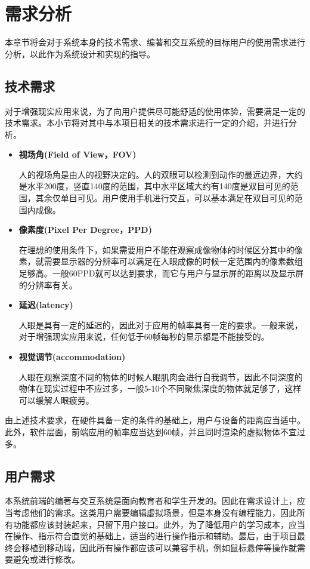 \chapter{需求分析}
\label{requirement}

本章节将会对于系统本身的技术需求、编著和交互系统的目标用户的使用需求进行分析，以此作为系统设计和实现的指导。

\section{技术需求}
对于增强现实应用来说，为了向用户提供尽可能舒适的使用体验，需要满足一定的技术需求。本小节将对其中与本项目相关的技术需求\cite{artech}进行一定的介绍，并进行分析。

\begin{itemize}
    \item \textbf{视场角(Field of View，FOV)}
    
       人的视场角是由人的视野决定的。人的双眼可以检测到动作的最远边界，大约是水平200度，竖直140度的范围，其中水平区域大约有140度是双目可见的范围，其余仅单目可见。用户使用手机进行交互，可以基本满足在双目可见的范围内成像。
    
    \item \textbf{像素度(Pixel Per Degree，PPD)}
    
     在理想的使用条件下，如果需要用户不能在观察成像物体的时候区分其中的像素，就需要显示器的分辨率可以满足在人眼成像的时候一定范围内的像素数组足够高。一般60PPD就可以达到要求，而它与用户与显示屏的距离以及显示屏的分辨率有关。
    
    \item \textbf{延迟(latency)}
    
      人眼是具有一定的延迟的，因此对于应用的帧率具有一定的要求。一般来说，对于增强现实应用来说，任何低于60帧每秒的显示都是不能接受的。
    
    \item \textbf{视觉调节(accommodation)}
    
    人眼在观察深度不同的物体的时候人眼肌肉会进行自我调节，因此不同深度的物体在现实过程中不应过多，一般5-10个不同聚焦深度的物体就足够了，这样可以缓解人眼疲劳。
\end{itemize}

\indent    	由上述技术要求，在硬件具备一定的条件的基础上，用户与设备的距离应当适中。此外，软件层面，前端应用的帧率应当达到60帧，并且同时渲染的虚拟物体不宜过多。

\section{用户需求}
本系统前端的编著与交互系统是面向教育者和学生开发的。因此在需求设计上，应当考虑他们的需求。这类用户需要编辑虚拟场景，但是本身没有编程能力，因此所有功能都应该封装起来，只留下用户接口。此外，为了降低用户的学习成本，应当在操作、指示符合直觉的基础上，适当的进行操作指示和辅助。最后，由于项目最终会移植到移动端，因此所有操作都应该可以兼容手机，例如鼠标悬停等操作就需要避免或进行修改。
